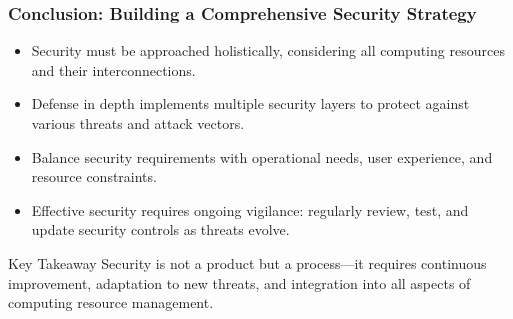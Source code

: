\documentclass{beamer}
\begin{document}
\begin{frame}
    \frametitle{Conclusion: Building a Comprehensive Security Strategy}
    
    \begin{itemize}
        \item Security must be approached holistically, considering all computing resources and their interconnections.
        \item Defense in depth implements multiple security layers to protect against various threats and attack vectors.
        \item Balance security requirements with operational needs, user experience, and resource constraints.
        \item Effective security requires ongoing vigilance: regularly review, test, and update security controls as threats evolve.
    \end{itemize}
    
    \begin{alertblock}{Key Takeaway}
        Security is not a product but a process—it requires continuous improvement, adaptation to new threats, and integration into all aspects of computing resource management.
    \end{alertblock}
\end{frame}
\end{document}
